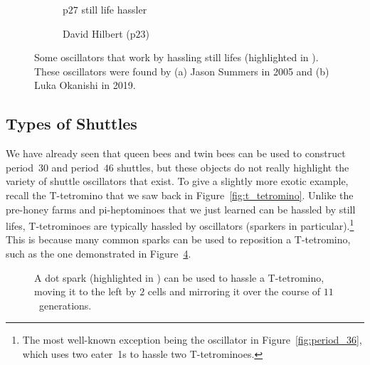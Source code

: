 \begin{figure}[!htb]
	\centering
	\begin{subfigure}{.52\textwidth}
		\centering
		\caption{p$27$ still life hassler}
		\label{fig:p27_hassler}
	\end{subfigure} \hfill %
	\begin{subfigure}{.44\textwidth}
		\centering
		\caption{David Hilbert (p$23$)}
		\label{fig:david_hilbert}
	\end{subfigure}
	\caption{Some oscillators that work by hassling still lifes (highlighted in ). These oscillators were found by (a) Jason Summers in 2005 and (b) Luka Okanishi in 2019.}\label{fig:still_life_hassler}
\end{figure}


\subsection{Types of Shuttles}\label{sec:shuttle_types}

We have already seen that queen bees and twin bees can be used to construct period~$30$ and period~$46$ shuttles, but these objects do not really highlight the variety of shuttle oscillators that exist. To give a slightly more exotic example, recall the T-tetromino that we saw back in Figure~\ref{fig:t_tetromino}. Unlike the pre-honey farms and pi-heptominoes that we just learned can be hassled by still lifes, T-tetrominoes are typically hassled by oscillators (sparkers in particular).\footnote{The most well-known exception being the oscillator in Figure~\ref{fig:period_36}, which uses two eater~1s to hassle two T-tetrominoes.} This is because many common sparks can be used to reposition a T-tetromino, such as the one demonstrated in Figure~\ref{fig:t_tetromino_hassle_1}.

\begin{figure}[!htb]
	\centering
	\caption{A dot spark (highlighted in ) can be used to hassle a T-tetromino, moving it to the left by $2$ cells and mirroring it over the course of $11$~generations.}\label{fig:t_tetromino_hassle_1}
\end{figure}

